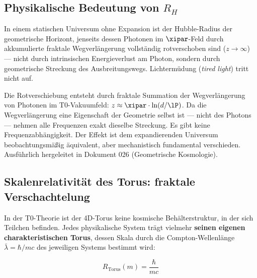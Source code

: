 \subsection{Physikalische Bedeutung von \texorpdfstring{$R_H$}{R\_H}}

In einem statischen Universum ohne Expansion ist der Hubble-Radius der geometrische Horizont, jenseits dessen Photonen im $\xipar$-Feld durch akkumulierte fraktale Wegverlängerung vollständig rotverschoben sind ($z \to \infty$) — nicht durch intrinsischen Energieverlust am Photon, sondern durch geometrische Streckung des Ausbreitungswegs. Lichter\-müdung (\textit{tired light}) tritt nicht auf.

\begin{keypoint}
Die Rotverschiebung entsteht durch fraktale Summation der Wegverlängerung von Photonen im T0-Vakuumfeld: $z \approx \xipar \cdot \ln(d/\lP)$. Da die Wegverlängerung eine Eigenschaft der Geometrie selbst ist — nicht des Photons — nehmen alle Frequenzen exakt dieselbe Streckung. Es gibt keine Frequenzabhängigkeit. Der Effekt ist dem expandierenden Universum beobachtungsmäßig äquivalent, aber mechanistisch fundamental verschieden. Ausführlich hergeleitet in Dokument 026 (Geometrische Kosmologie).
\end{keypoint}

\subsection{Skalenrelativität des Torus: fraktale Verschachtelung}

In der T0-Theorie ist der 4D-Torus keine kosmische Behälterstruktur, in der sich Teilchen befinden. Jedes physikalische System trägt vielmehr \textbf{seinen eigenen charakteristischen Torus}, dessen Skala durch die Compton-Wellenlänge $\bar\lambda = \hbar/mc$ des jeweiligen Systems bestimmt wird:

\begin{equation}
	R_{\text{Torus}}(m) = \frac{\hbar}{mc}
\end{equation}

\begin{table}[h]
\centering
{}
\caption{Systemspezifische Torus-Skalen — alle mit $L_0$ als gemeinsamer Untergrenze}
\end{table}

